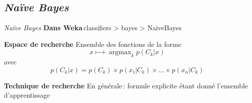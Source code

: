 \documentclass[hyperref={unicode}, xcolor={svgnames}, french]{beamer}
\DeclareMathOperator*\argmax{argmax}
\begin{document}

\subsection{\emph{Naïve Bayes}}

\begin{frame}{\emph{Naïve Bayes}}
    \textbf{Dans Weka} classifiers > bayes > NaiveBayes

    \textbf{Espace de recherche} Ensemble des fonctions de la forme
    \begin{equation}
        x ⟼ \argmax_k p(C_k | x)
    \end{equation}
    avec
    \begin{equation}
        p(C_k | x) = p(C_k) × p(x₁ | C_k) × … × p(x_n | C_k)
    \end{equation}

    \textbf{Technique de recherche} En générale : formule explicite étant donné l'ensemble d'apprentissage
\end{frame}
\end{document}
